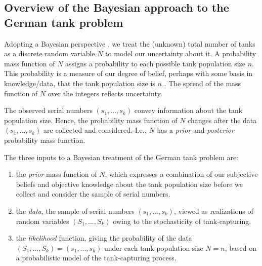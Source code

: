 \documentclass[11pt, oneside]{article}
\newcommand{\data}{$(s_1, ..., s_k)$\xspace}
\begin{document}
\subsection{Overview of the Bayesian approach to the German tank problem}
Adopting a Bayesian perspective \cite{downey2021think,bolstad2016introduction,van2021bayesian}, we treat the (unknown) total number of tanks as a discrete random variable $N$ to model our uncertainty about it. A probability mass function of $N$ assigns a probability to each possible tank population size $n$. This probability is a measure of our degree of belief, perhaps with some basis in knowledge/data, that the tank population size is $n$ \cite{ghosh2006introduction}. The spread of the mass function of $N$ over the integers reflects uncertainty. 

The observed serial numbers \data convey information about the tank population size. Hence, the probability mass function of $N$ changes after the data \data are collected and considered. I.e., $N$ has a \emph{prior} and \emph{posterior} probability mass function.

The three inputs to a Bayesian treatment of the German tank problem are: 
\begin{enumerate}
	\item the \emph{prior} mass function of $N$, which expresses a combination of our subjective beliefs and objective knowledge about the tank population size before we collect and consider the sample of serial numbers.
	\item the \emph{data}, the sample of serial numbers \data, viewed as realizations of random variables $(S_1, ..., S_k)$ owing to the stochasticity of tank-capturing.
	\item the \emph{likelihood} function, giving the probability of the data $(S_1, ..., S_k)=(s_1,...,s_k)$ under each tank population size $N=n$, based on a probabilistic model of the tank-capturing process.
\end{enumerate}
\end{document}
